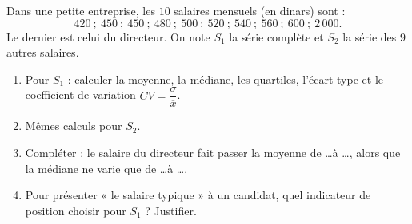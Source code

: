 
Dans une petite entreprise, les $10$ salaires mensuels (en dinars) sont :
$$420\ ;\ 450\ ;\ 450\ ;\ 480\ ;\ 500\ ;\ 520\ ;\ 540\ ;\ 560\ ;\ 600\ ;\ 2\,000.$$
Le dernier est celui du directeur. On note $S_1$ la série complète et $S_2$ la série des $9$ autres salaires.

\begin{enumerate}
  \item Pour $S_1$ : calculer la moyenne, la médiane, les quartiles, l'écart type et le coefficient de variation $CV=\dfrac{\sigma}{\overline{x}}$.
  \item Mêmes calculs pour $S_2$.
  \item Compléter : le salaire du directeur fait passer la moyenne de \ldots à \ldots, alors que la médiane ne varie que de \ldots à \ldots.
  \item Pour présenter « le salaire typique » à un candidat, quel indicateur de position choisir pour $S_1$ ? Justifier.
\end{enumerate}

